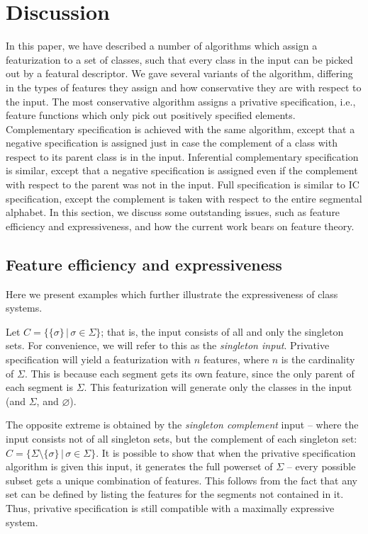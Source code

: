 \documentclass[12pt, oneside]{article}   	%
\begin{document}
\FloatBarrier
\section{Discussion}
\label{sec:discussion}

In this paper, we have described a number of algorithms which assign a featurization to a set of classes, such that every class in the input can be picked out by a featural descriptor. We gave several variants of the algorithm, differing in the types of features they assign and how conservative they are with respect to the input. The most conservative algorithm assigns a privative specification, i.e., feature functions which only pick out positively specified elements. Complementary specification is achieved with the same algorithm, except that a negative specification is assigned just in case the complement of a class with respect to its parent class is in the input. Inferential complementary specification is similar, except that a negative specification is assigned even if the complement with respect to the parent was not in the input. Full specification is similar to IC specification, except the complement is taken with respect to the entire segmental alphabet. In this section, we discuss some outstanding issues, such as feature efficiency and expressiveness, and how the current work bears on feature theory.

\subsection{Feature efficiency and expressiveness}

Here we present examples which further illustrate the expressiveness of class systems.

Let $C = \{ \{\sigma\} \, | \, \sigma \in \Sigma \}$; that is, the input consists of all and only the singleton sets. For convenience, we will refer to this as the \textit{singleton input}. Privative specification will yield a featurization with $n$ features, where $n$ is the cardinality of $\Sigma$. This is because each segment gets its own feature, since the only parent of each segment is $\Sigma$. This featurization will generate only the classes in the input (and $\Sigma$, and $\varnothing$).

The opposite extreme is obtained by the \textit{singleton complement} input -- where the input consists not of all singleton sets, but the complement of each singleton set:  $C = \{ \Sigma \setminus \{\sigma\} \, | \, \sigma \in \Sigma \}$. It is possible to show that when the privative specification algorithm is given this input, it generates the full powerset of $\Sigma$ -- every possible subset gets a unique combination of features. This follows from the fact that any set can be defined by listing the features for the segments not contained in it. Thus, privative specification is still compatible with a maximally expressive system.
\end{document}
